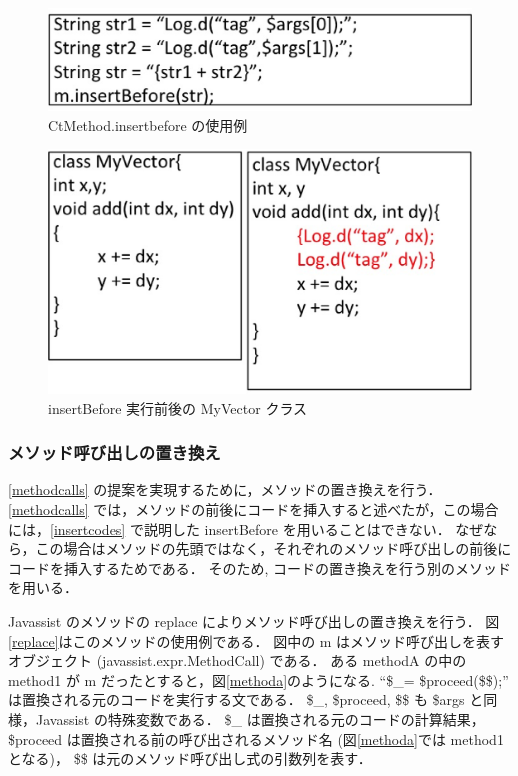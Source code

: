 \begin{figure}[t]
\begin{center}
\graphicspath{{./epsfiles/}}
\includegraphics[scale=0.3]{insertbefore2.eps}
\end{center}
\caption{CtMethod.insertbefore の使用例}
\label{insertbefore}
\end{figure}


\begin{figure}[t]
\begin{center}
\graphicspath{{./epsfiles/}}
\includegraphics[scale=0.3]{vector.eps}
\end{center}
\caption{insertBefore 実行前後の MyVector クラス}
\label{vector}
\end{figure}

\subsubsection{メソッド呼び出しの置き換え}
\label{replacement}
\ref{methodcalls} の提案を実現するために，メソッドの置き換えを行う．
\ref{methodcalls} では，メソッドの前後にコードを挿入すると述べたが，この場合には，\ref{insertcodes} で説明した insertBefore を用いることはできない．
なぜなら，この場合はメソッドの先頭ではなく，それぞれのメソッド呼び出しの前後にコードを挿入するためである．
そのため, コードの置き換えを行う別のメソッドを用いる．

 Javassist のメソッドの replace によりメソッド呼び出しの置き換えを行う．
図\ref{replace}はこのメソッドの使用例である．
図中の m はメソッド呼び出しを表すオブジェクト (javassist.expr.MethodCall) である．
ある methodA の中の method1 が m だったとすると，図\ref{methoda}のようになる.
``\$\_= \$proceed(\$\$);'' は置換される元のコードを実行する文である．
\$\_, \$proceed, \$\$ も \$args と同様，Javassist の特殊変数である．
\$\_ は置換される元のコードの計算結果，\$proceed は置換される前の呼び出されるメソッド名 (図\ref{methoda}では method1 となる)， \$\$ は元のメソッド呼び出し式の引数列を表す．

